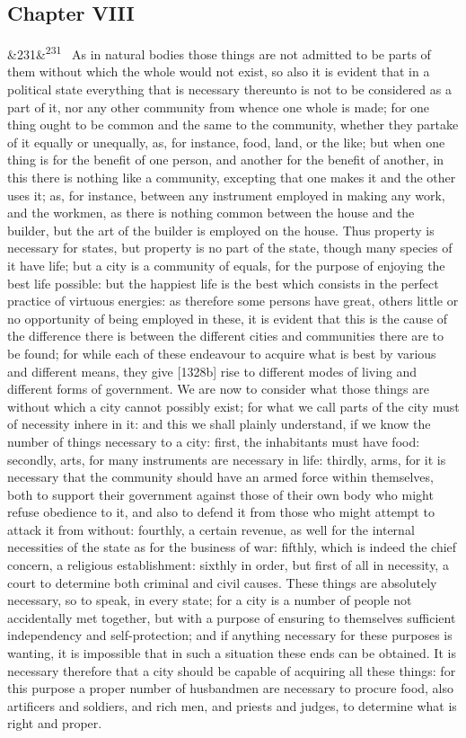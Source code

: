 \documentclass[12pt]{article}
\newcommand{\para}[1][]{\par\noindent\ifx&#1&\else\textsuperscript{\footnotesize #1}~\fi}
\begin{document}
\subsection*{Chapter VIII}

\para[231] As in natural bodies those things are not admitted to be parts of them without which the whole would not exist, so also it is evident that in a political state everything that is necessary thereunto is not to be considered as a part of it, nor any other community from whence one whole is made; for one thing ought to be common and the same to the community, whether they partake of it equally or unequally, as, for instance, food, land, or the like; but when one thing is for the benefit of one person, and another for the benefit of another, in this there is nothing like a community, excepting that one makes it and the other uses it; as, for instance, between any instrument employed in making any work, and the workmen, as there is nothing common between the house and the builder, but the art of the builder is employed on the house. Thus property is necessary for states, but property is no part of the state, though many species of it have life; but a city is a community of equals, for the purpose of enjoying the best life possible: but the happiest life is the best which consists in the perfect practice of virtuous energies: as therefore some persons have great, others little or no opportunity of being employed in these, it is evident that this is the cause of the difference there is between the different cities and communities there are to be found; for while each of these endeavour to acquire what is best by various and different means, they give [1328b] rise to different modes of living and different forms of government. We are now to consider what those things are without which a city cannot possibly exist; for what we call parts of the city must of necessity inhere in it: and this we shall plainly understand, if we know the number of things necessary to a city: first, the inhabitants must have food: secondly, arts, for many instruments are necessary in life: thirdly, arms, for it is necessary that the community should have an armed force within themselves, both to support their government against those of their own body who might refuse obedience to it, and also to defend it from those who might attempt to attack it from without: fourthly, a certain revenue, as well for the internal necessities of the state as for the business of war: fifthly, which is indeed the chief concern, a religious establishment: sixthly in order, but first of all in necessity, a court to determine both criminal and civil causes. These things are absolutely necessary, so to speak, in every state; for a city is a number of people not accidentally met together, but with a purpose of ensuring to themselves sufficient independency and self-protection; and if anything necessary for these purposes is wanting, it is impossible that in such a situation these ends can be obtained. It is necessary therefore that a city should be capable of acquiring all these things: for this purpose a proper number of husbandmen are necessary to procure food, also artificers and soldiers, and rich men, and priests and judges, to determine what is right and proper.
\end{document}
